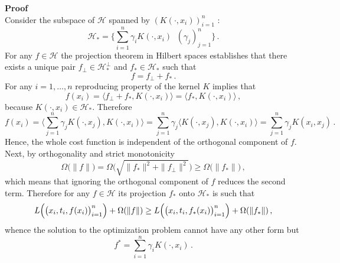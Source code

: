\documentclass[a4paper]{article}
\newcommand{\Hcal}{\mathcal{H}}
\begin{document}
\noindent\textbf{Proof} \hfill \\
Consider the subspace of $\Hcal$ spanned by $(K(\cdot, x_i ))_{i=1}^n$ :
\[
\Hcal_* = \bigl\{ \sum_{i=1}^n \gamma_i K(\cdot, x_i ) \,\:\,(\gamma_j)_{j=1}^n \bigr\}\,.
\]
For any $f\in \Hcal$ the projection theorem in Hilbert spaces establishes that there
exists a unique pair $f_\perp \in\Hcal_*^\perp$ and $f_* \in \Hcal_*$ such that
\[ f = f_\perp + f_* \,. \]
For any $i=1,\ldots,n$ reproducing property of the kernel $K$ implies that
\[
f(x_i)
= \langle f_\perp + f_*, K(\cdot, x_i)\rangle
= \langle f_*, K(\cdot, x_i)\rangle\,,
\]
because $K(\cdot, x_i)\in \Hcal_*$. Therefore
\[
f(x_i)
= \bigl\langle \sum_{j=1}^n \gamma_j K(\cdot, x_j ), K(\cdot, x_i)\bigr\rangle 
= \sum_{j=1}^n \gamma_j \langle K(\cdot, x_j ), K(\cdot, x_i)\rangle 
= \sum_{j=1}^n \gamma_j K(x_i, x_j)\,.
\]
Hence, the whole cost function is independent of the orthogonal component of $f$.
Next, by orthogonality and strict monotonicity
\[
\Omega\bigl( \|f\| \bigr)
= \Omega\bigl( \sqrt{\|f_*\|^2 + \|f_\perp\|^2} \bigr)
\geq \Omega\bigl( \|f_*\| \bigr)\,,
\]
which means that ignoring the orthogonal component of $f$ reduces the second term.
Therefore for any $f\in \Hcal$ its projection $f_*$ onto $\Hcal_*$ is such that
\[
L\Bigl( \bigl(x_i,t_i,f(x_i)\bigr)_{i=1}^n \Bigr) + \Omega(\|f\|)
\geq L\Bigl( \bigl(x_i,t_i,f_*(x_i)\bigr)_{i=1}^n \Bigr) + \Omega(\|f_*\|)\,,
\]
whence the solution to the optimization problem cannot have any other form but
\[ f^* = \sum_{i=1}^n \gamma_i K(\cdot, x_i)\,. \]
\end{document}
